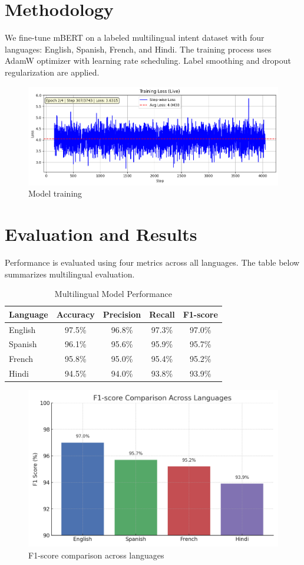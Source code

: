 \documentclass{ecai}
\begin{document}
\section{Methodology}
We fine-tune mBERT on a labeled multilingual intent dataset with four languages: English, Spanish, French, and Hindi. The training process uses AdamW optimizer with learning rate scheduling. Label smoothing and dropout regularization are applied.

\begin{figure}[h]
\centering
\includegraphics[width=0.8\linewidth]{Tuning.png}
\caption{Model training}
\end{figure}

\section{Evaluation and Results}
Performance is evaluated using four metrics across all languages. The table below summarizes multilingual evaluation.

\begin{table}[h]
\centering
\caption{Multilingual Model Performance}
\begin{tabular}{lcccc}
\toprule
Language & Accuracy & Precision & Recall & F1-score \\
\midrule
English  & 97.5\% & 96.8\% & 97.3\% & 97.0\% \\
Spanish  & 96.1\% & 95.6\% & 95.9\% & 95.7\% \\
French   & 95.8\% & 95.0\% & 95.4\% & 95.2\% \\
Hindi    & 94.5\% & 94.0\% & 93.8\% & 93.9\% \\
\bottomrule
\end{tabular}
\end{table}

\begin{figure}[h]
\centering
\includegraphics[width=0.8\linewidth]{f1_chart.png}
\caption{F1-score comparison across languages}
\end{figure}
\end{document}
